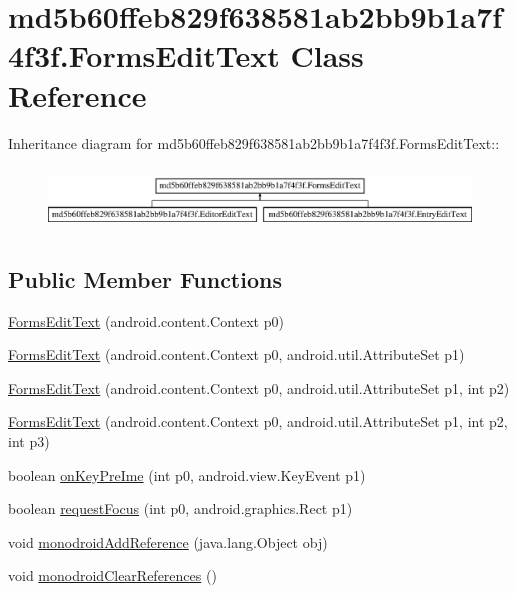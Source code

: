 \hypertarget{classmd5b60ffeb829f638581ab2bb9b1a7f4f3f_1_1_forms_edit_text}{
\section{md5b60ffeb829f638581ab2bb9b1a7f4f3f.FormsEditText Class Reference}
\label{classmd5b60ffeb829f638581ab2bb9b1a7f4f3f_1_1_forms_edit_text}
}
Inheritance diagram for md5b60ffeb829f638581ab2bb9b1a7f4f3f.FormsEditText::\begin{figure}[H]
\begin{center}
\leavevmode
\includegraphics[height=1.68675cm]{classmd5b60ffeb829f638581ab2bb9b1a7f4f3f_1_1_forms_edit_text}
\end{center}
\end{figure}
\subsection*{Public Member Functions}
\begin{CompactItemize}
\item 
\hyperlink{classmd5b60ffeb829f638581ab2bb9b1a7f4f3f_1_1_forms_edit_text_3b62a7c8e08706ae0e5e3fc89d15870f}{FormsEditText} (android.content.Context p0)
\item 
\hyperlink{classmd5b60ffeb829f638581ab2bb9b1a7f4f3f_1_1_forms_edit_text_fcf275c44999585a2a5d2eedde13e104}{FormsEditText} (android.content.Context p0, android.util.AttributeSet p1)
\item 
\hyperlink{classmd5b60ffeb829f638581ab2bb9b1a7f4f3f_1_1_forms_edit_text_aba2de54573e38c8c55109e4735d016a}{FormsEditText} (android.content.Context p0, android.util.AttributeSet p1, int p2)
\item 
\hyperlink{classmd5b60ffeb829f638581ab2bb9b1a7f4f3f_1_1_forms_edit_text_996753e5fb96d9610865be8c3c540ce9}{FormsEditText} (android.content.Context p0, android.util.AttributeSet p1, int p2, int p3)
\item 
boolean \hyperlink{classmd5b60ffeb829f638581ab2bb9b1a7f4f3f_1_1_forms_edit_text_9da716bfd9ed6cc587648da33453634a}{onKeyPreIme} (int p0, android.view.KeyEvent p1)
\item 
boolean \hyperlink{classmd5b60ffeb829f638581ab2bb9b1a7f4f3f_1_1_forms_edit_text_2cf9da01b54b44653275914d490d9716}{requestFocus} (int p0, android.graphics.Rect p1)
\item 
void \hyperlink{classmd5b60ffeb829f638581ab2bb9b1a7f4f3f_1_1_forms_edit_text_abff92edb59e12022a3bad902cad5b3c}{monodroidAddReference} (java.lang.Object obj)
\item 
void \hyperlink{classmd5b60ffeb829f638581ab2bb9b1a7f4f3f_1_1_forms_edit_text_842c9f28b9164b840f11c15e502397ff}{monodroidClearReferences} ()
\end{CompactItemize}
